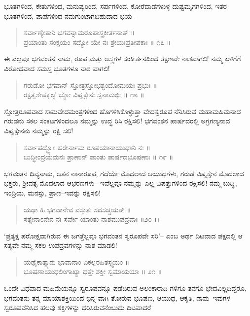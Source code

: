 ಭೂತಗಳಿಂದ, ಕೇತುಗಳಿಂದ, ಮನುಷ್ಯರಿಂದ, ಸರ್ಪಗಳಿಂದ, ಕೋರೆದಾಡೆಗಳುಳ್ಳ ದುಷ್ಟಮೃಗಗಳಿಂದ, ಇತರ ಭೂತಗಳಿಂದ, ಪಾಪಗಳಿಂದ ನಮಗುಂಟಾಗಬಹುದಾದ ಭಯ–

\begin{verse}
ಸರ್ವಾಣ್ಯೇತಾನಿ ಭಗವನ್ನಾಮರೂಪಾಸ್ತ್ರಕೀರ್ತನಾತ್ ॥\\ಪ್ರಯಾಂತು ಸಂಕ್ಷಯಂ ಸದ್ಯೋ ಯೇ ನಃ ಶ್ರೇಯಃಪ್ರತೀಪಕಾಃ \num{॥ ೧೭ ॥}
\end{verse}

ಈ ಎಲ್ಲವೂ ಭಗವಂತನ ನಾಮ, ರೂಪ ಮತ್ತು ಅಸ್ತ್ರಗಳ ಸಂಕೀರ್ತನದಿಂದ ತಕ್ಷಣವೇ ನಾಶವಾಗಲಿ! ನಮ್ಮ ಏಳಿಗೆಗೆ ವಿರೋಧವಾದ ಸಮಸ್ತ ಭೂತಗಳೂ ನಾಶ ವಾಗಲಿ!

\begin{verse}
ಗರುಡೋ ಭಗವಾನ್ ಸ್ತೋತ್ರಸ್ತೋಭಶ್ಛಂದೋಮಯಃ ಪ್ರಭುಃ ॥\\ರಕ್ಷತ್ವಶೇಷಕೃಚ್ಛೆ ಭ್ಯೋ ವಿಷ್ವಕ್ಸೇನಃ ಸ್ವನಾಮಭಿಃ \num{॥ ೧೮ ॥}
\end{verse}

ಸ್ತೋತ್ರರೂಪವಾದ ಸಾಮವೇದಮಂತ್ರಗಳಿಂದ ಹೊಗಳಿಸಿಕೊಳ್ಳುತ್ತಾ ವೇದಸ್ವರೂಪ ನೆನಿಸಿರುವ ಮಹಾಮಹಿಮನಾದ ಗರುಡನು ಸಕಲ ಸಂಕಟಗಳಿಂದಲೂ ನಮ್ಮನ್ನು ಉದ್ಧ ರಿಸಿ ರಕ್ಷಿಸಲಿ! ಭಗವಂತನ ಪಾರ್ಷದರಲ್ಲಿ ಅಗ್ರಗಣ್ಯನಾದ ವಿಷ್ವಕ್ಸೇನನು ನಮ್ಮನ್ನು ರಕ್ಷಿ ಸಲಿ!

\begin{verse}
ಸರ್ವಾಪದ್ಭ್ಯೋ ಹರೇರ್ನಾಮ ರೂಪಯಾನಾಯುಧಾನಿ ನಃ ॥\\ಬುದ್ಧೀಂದ್ರಯಮನಃ ಪ್ರಾಣಾನ್ ಪಾಂತು ಪಾರ್ಷದಭೂಷಣಾಃ \num{॥ ೧೯ ॥}
\end{verse}

ಭಗವಂತನ ದಿವ್ಯನಾಮ, ಆತನ ನಾನಾರೂಪ, ಗದೆಯೇ ಮೊದಲಾದ ಆಯುಧಗಳು, ಗರುಡ ವಿಷ್ವಕ್ಸೇನ ಮೊದಲಾದ ಭಕ್ತರು, ಶ್ರೀವತ್ಸ ಮೊದಲಾದ ಆಭರಣಗಳು– ಇವೆಲ್ಲವೂ ನಮ್ಮನ್ನು ಎಲ್ಲ ವಿಪತ್ತುಗಳಿಂದ ರಕ್ಷಿಸಲಿ! ನಮ್ಮ ಬುದ್ಧಿ, ಇಂದ್ರಿಯ, ಮನಸ್ಸು, ಪ್ರಾಣ–ಇವನ್ನು ರಕ್ಷಿಸಲಿ!

\begin{verse}
ಯಥಾ ಹಿ ಭಗವಾನೇವ ವಸ್ತುತಃ ಸದಸಚ್ಚಯತ್ ॥\\ಸತ್ಯೇನಾಽನೇನ ನಃ ಸರ್ವೇ ಯಾಂತು ನಾಶಮುಪದ್ರವಾಃ \num{॥೨೦ ।।}
\end{verse}

‘ಪ್ರತ್ಯಕ್ಷ ಪರೋಕ್ಷವಾಗಿರುವ ಈ ಜಗತ್ತೆಲ್ಲವೂ ಭಗವಂತನ ಸ್ವರೂಪವೇ ಸರಿ’– ಎಂಬ ಅರ್ಥ ದಿಟವಾದ ಪಕ್ಷದಲ್ಲಿ ಆ ಸತ್ಯವೇ ನಮ್ಮ ಸಕಲ ಉಪದ್ರವಗಳನ್ನು ನಾಶ ಮಾಡಲಿ!

\begin{verse}
ಯಥೈಕಾತ್ಮ್ಯಾನು ಭಾವಾನಾಂ ವಿಕಲ್ಪರಹಿತಸ್ಸ್ವಯಂ ॥\\ಭೂಷಣಾಯುಧಲಿಂಗಾಖ್ಯಾ ಧತ್ತೇ ಶಕ್ತೀ ಸ್ವಮಾಯಯಾ \num{॥ ೨೧ ॥}
\end{verse}

ಒಂದೇ ವಿಧವಾದ ಮಹಿಮೆಯನ್ನೂ ಸ್ವರೂಪವನ್ನೂ ಪಡೆದಿರುವ ಅಲಂಕಾರಾದಿ ಗಳಿಗೂ ತನಗೂ ಭೇದವಿಲ್ಲದಿದ್ದರೂ, ಭಗವಂತನು ತನ್ನ ಮಾಯಾಶಕ್ತಿಯಿಂದ ಭಿನ್ನ ವಾಗಿ ತೋರುವ ಭೂಷಣ, ಆಯುಧ, ಆಕೃತಿ, ನಾಮ–ಇವುಗಳ ಸ್ವರೂಪವೆನಿಸಿದ ಹಲವು ಶಕ್ತಿಗಳನ್ನು ಧರಿಸಿರುವನೆಂಬುದು ದಿಟವಾದರೆ

